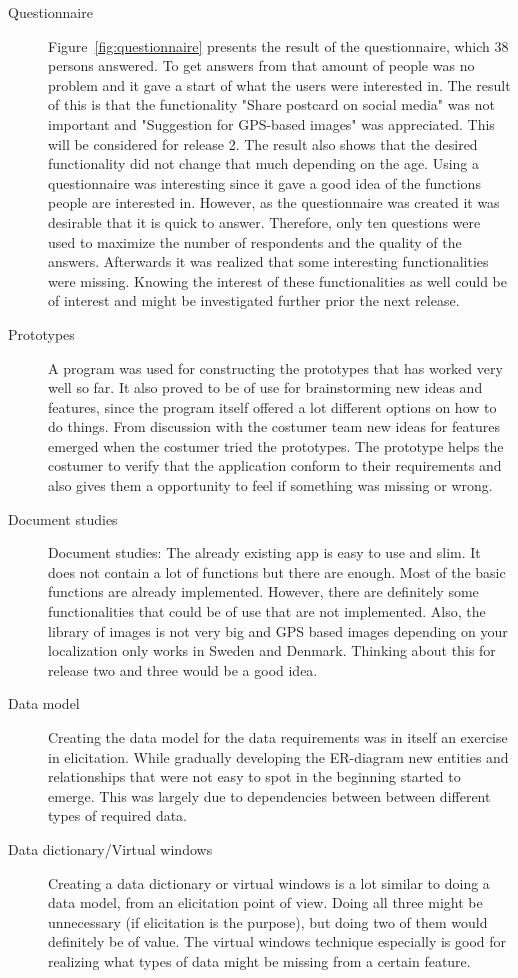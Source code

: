 \documentclass[10pt,a4paper]{article}
\begin{document}
\begin{description}
\item[Questionnaire] Figure~\ref{fig:questionnaire} presents the result of the questionnaire, which 38 persons answered. To get answers from that amount of people was no problem and it gave a start of what the users were interested in. The result of this is that the functionality "Share postcard on social media" was not important and "Suggestion for GPS-based images" was appreciated. This will be considered for release 2. The result also shows that the desired functionality did not change that much depending on the age. Using a questionnaire was interesting since it gave a good idea of the functions people are interested in. However, as the questionnaire  was created it was desirable that it is quick to answer. Therefore, only ten questions were used to maximize the number of respondents and the quality of the answers. Afterwards it was realized that some interesting functionalities were missing. Knowing the interest of these functionalities as well could be of interest and might be investigated further prior the next release.

\item[Prototypes] A program was used for constructing the prototypes that has worked very well so far. It also proved to be of use for brainstorming new ideas and features, since the program itself offered a lot different options on how to do things. 
From discussion with the costumer team new ideas for features emerged when the costumer tried the prototypes. The prototype helps the costumer to verify that the application conform to their requirements and also gives them a opportunity to feel if something was missing or wrong.

\item[Document studies] Document studies: The already existing app is easy to use and slim. It does not contain a lot of functions but there are enough. Most of the basic functions are already implemented. However, there are definitely some functionalities that could be of use that are not implemented. Also, the library of images is not very big and GPS based images depending on your localization only works in Sweden and Denmark. Thinking about this for release two and three would be a good idea.

\item[Data model] Creating the data model for the data requirements was in itself an exercise in elicitation. While gradually developing the ER-diagram new entities and relationships that were not easy to spot in the beginning started to emerge. This was largely due to dependencies between between different types of required data.

\item[Data dictionary/Virtual windows] Creating a data dictionary or virtual windows is a lot similar to doing a data model, from an elicitation point of view. Doing all three might be unnecessary (if elicitation is the purpose), but doing two of them would definitely be of value. The virtual windows technique especially is good for realizing what types of data might be missing from a certain feature.
\end{description}
\end{document}
